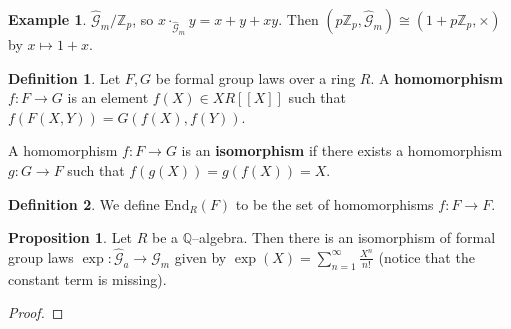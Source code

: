 \documentclass{article}
\theoremstyle{definition}
\newtheorem{prop}[theorem]{Proposition}
\newtheorem{example}{Example}[section]
\newtheorem{defn}{Definition}[section]
\begin{document}
\begin{example}
    $\hat{\mathcal{G}}_m/\mathbb{Z}_p$, so $x \cdot_{\hat{\mathcal{G}}_m} y = x + y + xy$. Then $(p \mathbb{Z}_p, \hat{\mathcal{G}}_m) \cong (1 + p \mathbb{Z}_p, \times)$ by $x \mapsto 1 + x$.
\end{example}
\begin{defn}
    Let $F,G$ be formal group laws over a ring $R$. A \textbf{homomorphism} $f : F \to G$ is an element $f(X) \in XR[[X]]$ such that $f(F(X,Y))=G(f(X),f(Y))$.
    \vspace{1mm}
     
    A homomorphism $f : F \to G$ is an \textbf{isomorphism} if there exists a homomorphism $g : G \to F$ such that $f(g(X))=g(f(X))=X$.
\end{defn}
\begin{defn}
    We define $\text{End}_R(F)$ to be the set of homomorphisms $f: F \to F$.
\end{defn}
\begin{prop}
    Let $R$ be a $\mathbb{Q}$--algebra. Then there is an isomorphism of formal group laws $\exp : \hat{\mathcal{G}}_a \to \hat{\mathcal{G}}_m$ given by $\exp(X) = \sum_{n=1}^{\infty} \frac{X^n}{n!}$ (notice that the constant term is missing).
\end{prop}
\begin{proof}
    
\end{proof}
\end{document}

